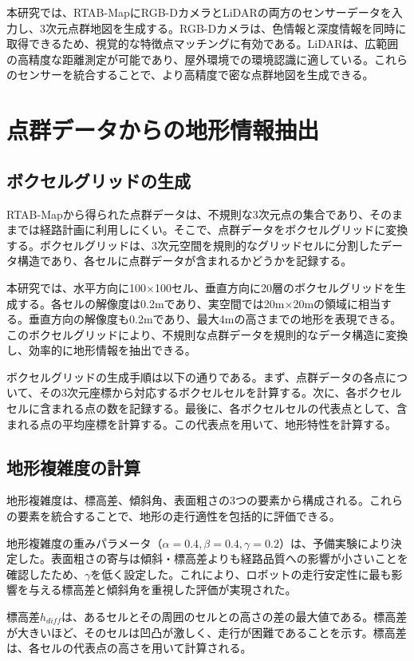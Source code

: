 本研究では、RTAB-MapにRGB-DカメラとLiDARの両方のセンサーデータを入力し、3次元点群地図を生成する。RGB-Dカメラは、色情報と深度情報を同時に取得できるため、視覚的な特徴点マッチングに有効である。LiDARは、広範囲の高精度な距離測定が可能であり、屋外環境での環境認識に適している。これらのセンサーを統合することで、より高精度で密な点群地図を生成できる。

\section{点群データからの地形情報抽出}

\subsection{ボクセルグリッドの生成}

RTAB-Mapから得られた点群データは、不規則な3次元点の集合であり、そのままでは経路計画に利用しにくい。そこで、点群データをボクセルグリッドに変換する。ボクセルグリッドは、3次元空間を規則的なグリッドセルに分割したデータ構造であり、各セルに点群データが含まれるかどうかを記録する。

本研究では、水平方向に100×100セル、垂直方向に20層のボクセルグリッドを生成する。各セルの解像度は0.2mであり、実空間では20m×20mの領域に相当する。垂直方向の解像度も0.2mであり、最大4mの高さまでの地形を表現できる。このボクセルグリッドにより、不規則な点群データを規則的なデータ構造に変換し、効率的に地形情報を抽出できる。

ボクセルグリッドの生成手順は以下の通りである。まず、点群データの各点について、その3次元座標から対応するボクセルセルを計算する。次に、各ボクセルセルに含まれる点の数を記録する。最後に、各ボクセルセルの代表点として、含まれる点の平均座標を計算する。この代表点を用いて、地形特性を計算する。

\subsection{地形複雑度の計算}

地形複雑度は、標高差、傾斜角、表面粗さの3つの要素から構成される。これらの要素を統合することで、地形の走行適性を包括的に評価できる。

地形複雑度の重みパラメータ（$\alpha=0.4, \beta=0.4, \gamma=0.2$）は、予備実験により決定した。表面粗さの寄与は傾斜・標高差よりも経路品質への影響が小さいことを確認したため、$\gamma$を低く設定した。これにより、ロボットの走行安定性に最も影響を与える標高差と傾斜角を重視した評価が実現された。

標高差$h_{diff}$は、あるセルとその周囲のセルとの高さの差の最大値である。標高差が大きいほど、そのセルは凹凸が激しく、走行が困難であることを示す。標高差は、各セルの代表点の高さを用いて計算される。

